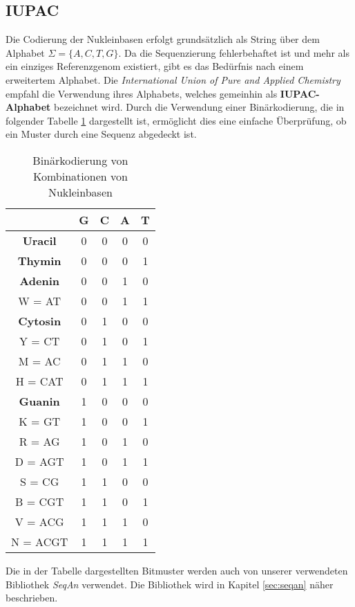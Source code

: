 \subsection{IUPAC}
\label{sec:data:iupac}
Die Codierung der Nukleinbasen erfolgt grundsätzlich als String über dem Alphabet $\Sigma = \lbrace A, C, T, G \rbrace$. Da die Sequenzierung fehlerbehaftet ist und mehr als ein einziges Referenzgenom existiert, gibt es das Bedürfnis nach einem erweitertem Alphabet. Die \textit{International Union of Pure and Applied Chemistry} \citep{Iupac} empfahl die Verwendung ihres Alphabets, welches gemeinhin als \textbf{IUPAC-Alphabet} bezeichnet wird. Durch die Verwendung einer Binärkodierung, die in folgender Tabelle \ref{table:iupac} dargestellt ist, ermöglicht dies eine einfache Überprüfung, ob ein Muster durch eine Sequenz abgedeckt ist.
\begin{table}[h]
\begin{center}
	\begin{tabular}{|c|c|c|c|c|}
	\hline 
	& \textbf{G} & \textbf{C} & \textbf{A} & \textbf{T} \\ 
	\hline 
	\textbf{Uracil} & 0 & 0 & 0 & 0 \\ 
	\hline 
	\rowcolor{green} \textbf{Thymin} & 0 & 0 & 0 & 1 \\ 
	\hline 
	\rowcolor{green} \textbf{Adenin} & 0 & 0 & 1 & 0 \\ 
	\hline 
	W = AT & 0 & 0 & 1 & 1 \\ 
	\hline 
	\rowcolor{green} \textbf{Cytosin} & 0 & 1 & 0 & 0 \\ 
	\hline 
	Y = CT & 0 & 1 & 0 & 1 \\ 
	\hline 
	M = AC & 0 & 1 & 1 & 0 \\ 
	\hline 
	H = CAT & 0 & 1 & 1 & 1 \\ 
	\hline 
	\rowcolor{green} \textbf{Guanin} & 1 & 0 & 0 & 0 \\ 
	\hline 
	K = GT & 1 & 0 & 0 & 1 \\ 
	\hline 
	R = AG & 1 & 0 & 1 & 0 \\ 
	\hline 
	D = AGT & 1 & 0 & 1 & 1 \\ 
	\hline 
	S = CG & 1 & 1 & 0 & 0 \\ 
	\hline 
	B = CGT & 1 & 1 & 0 & 1 \\ 
	\hline 
	V = ACG & 1 & 1 & 1 & 0 \\ 
	\hline 
	N = ACGT & 1 & 1 & 1 & 1 \\ 
	\hline 
	\end{tabular} 
\end{center}
\label{table:iupac}
\caption{Binärkodierung von Kombinationen von Nukleinbasen}
\end{table}
Die in der Tabelle dargestellten Bitmuster werden auch von unserer verwendeten Bibliothek \textit{SeqAn} verwendet. Die Bibliothek wird in Kapitel \ref{sec:seqan} näher beschrieben.
\newpage
